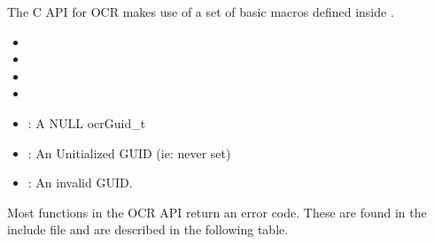The C API for OCR makes use of a set of basic macros defined
 inside .
\begin{itemize}
\item {}
\item {}
\item {}
\item {}
\item {}: A NULL ocrGuid\_t
\item {}: An Unitialized GUID (ie: never set)
\item {}: An invalid GUID.
\end{itemize}

Most functions in the OCR API return an error code. These are found
in the  include file and are described in the following table.


